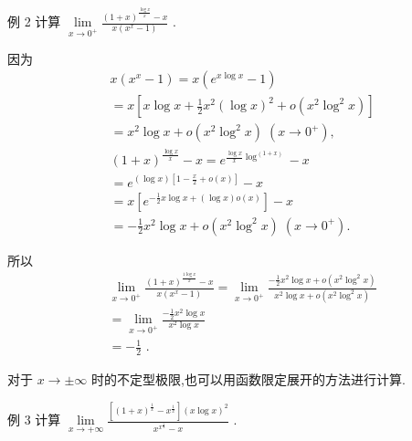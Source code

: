 例 2 计算 $\mathop{\lim }\limits_{{x \rightarrow  {0}^{ + }}}\frac{{\left( 1 + x\right) }^{\frac{\log x}{x}} - x}{x\left( {{x}^{x} - 1}\right) }$ .

因为
\begin{align*}
	&x\left( {{x}^{x} - 1}\right)  = x\left( {{e}^{x\log x} - 1}\right)\\
	&= x\left\lbrack  {x\log x + \frac{1}{2}{x}^{2}{\left( \log x\right) }^{2} + o\left( {{x}^{2}{\log }^{2}x}\right) }\right\rbrack\\
	&= {x}^{2}\log x + o\left( {{x}^{2}{\log }^{2}x}\right) \;\left( {x \rightarrow  {0}^{ + }}\right) ,\\
	&{\left( 1 + x\right) }^{\frac{\log x}{x}} - x = {e}^{\frac{\log x}{x}{\log }^{\left( 1 + x\right) }} - x\\
	&= {e}^{\left( {\log x}\right) \left\lbrack  {1 - \frac{x}{2} + o\left( x\right) }\right\rbrack  } - x\\
	&= x\left\lbrack  {e}^{-\frac{1}{2}x\log x + \left( {\log x}\right) o\left( x\right) }\right\rbrack   - x\\
	&=  - \frac{1}{2}{x}^{2}\log x + o\left( {{x}^{2}{\log }^{2}x}\right) \;\left( {x \rightarrow  {0}^{ + }}\right) .
\end{align*}

所以
\begin{align*}
	&\mathop{\lim }\limits_{{x \rightarrow  {0}^{ + }}}\frac{{\left( 1 + x\right) }^{\frac{1\log x}{x}} - x}{x\left( {{x}^{x} - 1}\right) } = \mathop{\lim }\limits_{{x \rightarrow  {0}^{ + }}}\frac{-\frac{1}{2}{x}^{2}\log x + o\left( {{x}^{2}{\log }^{2}x}\right) }{{x}^{2}\log x + o\left( {{x}^{2}{\log }^{2}x}\right) }\\
	&= \mathop{\lim }\limits_{{x \rightarrow  {0}^{ + }}}\frac{-\frac{1}{2}{x}^{2}\log x}{{x}^{2}\log x}\\
	&=  - \frac{1}{2}\text{ . }
\end{align*}

对于 $x \rightarrow   \pm  \infty$ 时的不定型极限,也可以用函数限定展开的方法进行计算.

例 3 计算 $\mathop{\lim }\limits_{{x \rightarrow   + \infty }}\frac{\left\lbrack  {{\left( 1 + x\right) }^{\frac{1}{x}} - {x}^{\frac{1}{x}}}\right\rbrack  {\left( x\log x\right) }^{2}}{{x}^{{x}^{\frac{1}{x}}} - x}$ .


